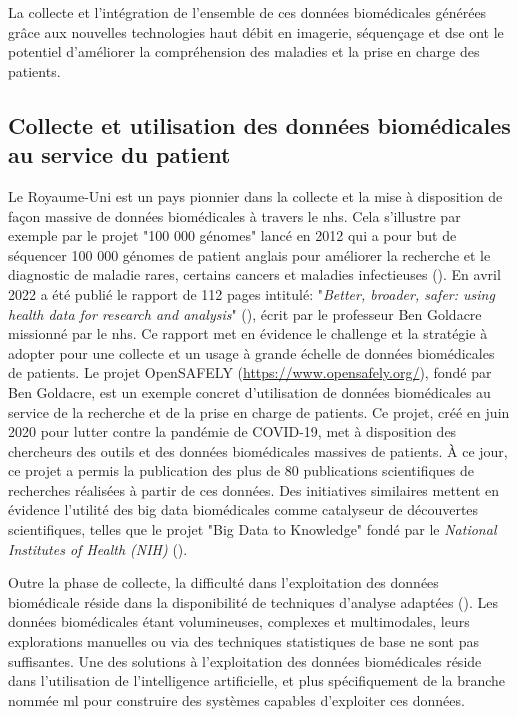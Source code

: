 La collecte et l'intégration de l'ensemble de ces données biomédicales générées grâce aux nouvelles technologies haut débit en imagerie, séquençage et \gls{dse} ont le potentiel d'améliorer la compréhension des maladies et la prise en charge des patients.

\subsection{Collecte et utilisation des données biomédicales au service du patient}
Le Royaume-Uni est un pays pionnier dans la collecte et la mise à disposition de façon massive de données biomédicales à travers le \gls{nhs}. Cela s'illustre par exemple par le projet "100 000 génomes" lancé en 2012 qui a pour but de séquencer 100 000 génomes de patient anglais pour améliorer la recherche et le diagnostic de maladie rares, certains cancers et maladies infectieuses (\cite{nunn_public_2019}). En avril 2022 a été publié le rapport de 112 pages intitulé: "\textit{Better, broader, safer: using health data for research and analysis}" (\cite{ben_goldacre_better_2022}), écrit par le professeur Ben Goldacre missionné par le \gls{nhs}. Ce rapport met en évidence le challenge et la stratégie à adopter pour une collecte et un usage à grande échelle de données biomédicales de patients. Le projet OpenSAFELY (\href{https://www.opensafely.org/}{https://www.opensafely.org/}), fondé par Ben Goldacre, est un exemple concret d'utilisation de données biomédicales au service de la recherche et de la prise en charge de patients. Ce projet, créé en juin 2020 pour lutter contre la pandémie de COVID-19, met à disposition des chercheurs des outils et des données biomédicales massives de patients. À ce jour, ce projet a permis la publication des plus de 80 publications scientifiques de recherches réalisées à partir de ces données. Des initiatives similaires  mettent en évidence l'utilité des big data biomédicales comme catalyseur de découvertes scientifiques, telles que le projet "Big Data to Knowledge" fondé par le \textit{National Institutes of Health (NIH)} (\cite{toga_big_2015}).

Outre la phase de collecte, la difficulté dans l'exploitation des données biomédicale réside dans la disponibilité de techniques d'analyse adaptées (\cite{wang_big_2019, ismail_requirements_2020}). Les données biomédicales étant volumineuses, complexes et multimodales, leurs explorations manuelles ou via des techniques statistiques de base ne sont pas suffisantes. Une des solutions à l'exploitation des données biomédicales réside dans l'utilisation de l'intelligence artificielle, et plus spécifiquement de la branche nommée \gls{ml} pour construire des systèmes capables d'exploiter ces données.

